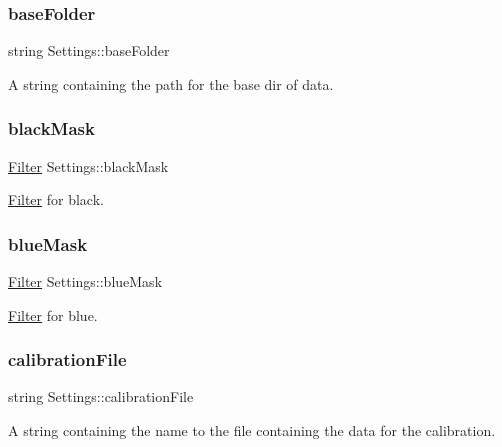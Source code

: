 \subsubsection{\texorpdfstring{baseFolder}{baseFolder}}
{\footnotesize\ttfamily string Settings\+::base\+Folder}



A string containing the path for the base dir of data. 

\mbox{\label{class_settings_a78ac37593a52a83973e18deefb2cc96c}} 
\subsubsection{\texorpdfstring{blackMask}{blackMask}}
{\footnotesize\ttfamily \mbox{\hyperlink{class_filter}{Filter}} Settings\+::black\+Mask}



\mbox{\hyperlink{class_filter}{Filter}} for black. 

\mbox{\label{class_settings_a2b425f747b936e82dfe0b609538f06f1}} 
\subsubsection{\texorpdfstring{blueMask}{blueMask}}
{\footnotesize\ttfamily \mbox{\hyperlink{class_filter}{Filter}} Settings\+::blue\+Mask}



\mbox{\hyperlink{class_filter}{Filter}} for blue. 

\mbox{\label{class_settings_ac6ff9ca8d90b9e43e26c069c88b7c699}} 
\subsubsection{\texorpdfstring{calibrationFile}{calibrationFile}}
{\footnotesize\ttfamily string Settings\+::calibration\+File}



A string containing the name to the file containing the data for the calibration. 

